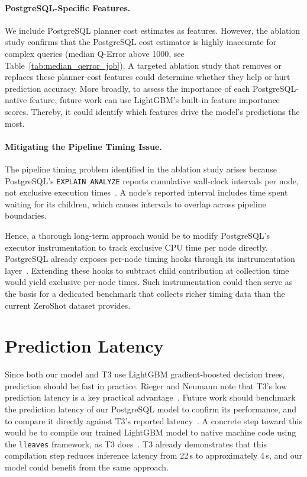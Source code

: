 \paragraph{PostgreSQL-Specific Features.}
We include PostgreSQL planner cost estimates as features.
However, the ablation study confirms that the PostgreSQL cost estimator is highly inaccurate
for complex queries (median Q-Error above 1000, see Table~\ref{tab:median_qerror_job}).
A targeted ablation study that removes or replaces these planner-cost features
could determine whether they help or hurt prediction accuracy.
More broadly, to assess the importance of each PostgreSQL-native feature,
future work can use LightGBM's built-in feature importance scores.
Thereby, it could identify which features drive the model's predictions the most.


\paragraph{Mitigating the Pipeline Timing Issue.}
The pipeline timing problem identified in the ablation study arises because
PostgreSQL's \texttt{EXPLAIN ANALYZE} reports cumulative wall-clock intervals per node,
not exclusive execution times~\parencite{postgresql_docs_explain}.
A node's reported interval includes time spent waiting for its children,
which causes intervals to overlap across pipeline boundaries.

Hence, a thorough long-term approach would be to modify PostgreSQL's executor instrumentation to track exclusive CPU time per node directly.
PostgreSQL already exposes per-node timing hooks through its instrumentation layer~\parencite{postgresql_docs_explain}.
Extending these hooks to subtract child contribution at collection time would yield exclusive per-node times.
Such instrumentation could then serve as the basis for a dedicated benchmark that collects richer timing data than the current ZeroShot dataset provides.

\section{Prediction Latency}

Since both our model and T3 use LightGBM gradient-boosted decision trees,
prediction should be fast in practice.
Rieger and Neumann note that T3's low prediction latency is a key practical advantage~\parencite{t3}.
Future work should benchmark the prediction latency of our PostgreSQL model
to confirm its performance,
and to compare it directly against T3's reported latency~\parencite{t3}.
A concrete step toward this would be to compile our trained LightGBM model to native machine code using the \texttt{lleaves} framework, as T3 does~\parencite{t3}.
T3 already demonstrates that this compilation step reduces inference latency from 22\,\textmu{}s to approximately 4\,\textmu{}s, and our model could benefit from the same approach.

